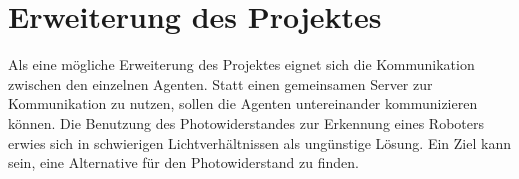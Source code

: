 \section{Erweiterung des Projektes}

Als eine mögliche Erweiterung des Projektes eignet sich die Kommunikation zwischen den einzelnen Agenten. Statt einen gemeinsamen Server zur Kommunikation zu nutzen, sollen die Agenten untereinander kommunizieren können. Die Benutzung des Photowiderstandes zur Erkennung eines Roboters erwies sich in schwierigen Lichtverhältnissen als ungünstige Lösung. Ein Ziel kann sein, eine Alternative für den Photowiderstand zu finden.   
